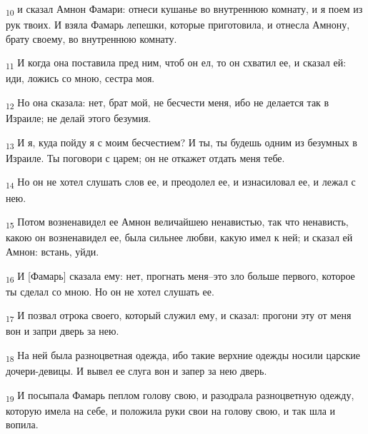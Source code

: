 \begin{tcolorbox}
\textsubscript{10} и сказал Амнон Фамари: отнеси кушанье во внутреннюю комнату, и я поем из рук твоих. И взяла Фамарь лепешки, которые приготовила, и отнесла Амнону, брату своему, во внутреннюю комнату.
\end{tcolorbox}
\begin{tcolorbox}
\textsubscript{11} И когда она поставила пред ним, чтоб он ел, то он схватил ее, и сказал ей: иди, ложись со мною, сестра моя.
\end{tcolorbox}
\begin{tcolorbox}
\textsubscript{12} Но она сказала: нет, брат мой, не бесчести меня, ибо не делается так в Израиле; не делай этого безумия.
\end{tcolorbox}
\begin{tcolorbox}
\textsubscript{13} И я, куда пойду я с моим бесчестием? И ты, ты будешь одним из безумных в Израиле. Ты поговори с царем; он не откажет отдать меня тебе.
\end{tcolorbox}
\begin{tcolorbox}
\textsubscript{14} Но он не хотел слушать слов ее, и преодолел ее, и изнасиловал ее, и лежал с нею.
\end{tcolorbox}
\begin{tcolorbox}
\textsubscript{15} Потом возненавидел ее Амнон величайшею ненавистью, так что ненависть, какою он возненавидел ее, была сильнее любви, какую имел к ней; и сказал ей Амнон: встань, уйди.
\end{tcolorbox}
\begin{tcolorbox}
\textsubscript{16} И [Фамарь] сказала ему: нет, прогнать меня--это зло больше первого, которое ты сделал со мною. Но он не хотел слушать ее.
\end{tcolorbox}
\begin{tcolorbox}
\textsubscript{17} И позвал отрока своего, который служил ему, и сказал: прогони эту от меня вон и запри дверь за нею.
\end{tcolorbox}
\begin{tcolorbox}
\textsubscript{18} На ней была разноцветная одежда, ибо такие верхние одежды носили царские дочери-девицы. И вывел ее слуга вон и запер за нею дверь.
\end{tcolorbox}
\begin{tcolorbox}
\textsubscript{19} И посыпала Фамарь пеплом голову свою, и разодрала разноцветную одежду, которую имела на себе, и положила руки свои на голову свою, и так шла и вопила.
\end{tcolorbox}
